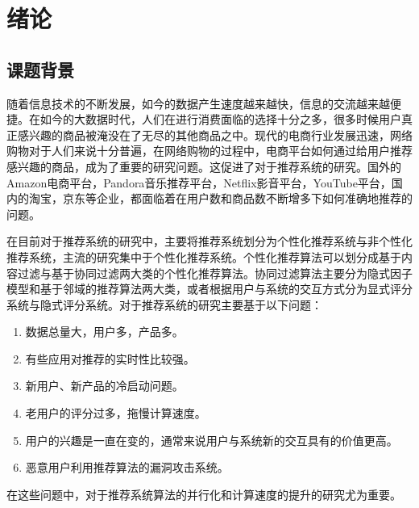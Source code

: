\chapter{绪论}
%
%
%
%
%



\section{课题背景}
随着信息技术的不断发展，如今的数据产生速度越来越快，信息的交流越来越便捷。在如今的大数据时代，人们在进行消费面临的选择十分之多，很多时候用户真正感兴趣的商品被淹没在了无尽的其他商品之中。现代的电商行业发展迅速，网络购物对于人们来说十分普遍，在网络购物的过程中，电商平台如何通过给用户推荐感兴趣的商品，成为了重要的研究问题。这促进了对于推荐系统的研究。国外的Amazon电商平台\cite{Linden:2003kc}，Pandora音乐推荐平台，Netflix影音平台，YouTube平台\cite{Davidson:2010hg}，国内的淘宝，京东等企业，都面临着在用户数和商品数不断增多下如何准确地推荐的问题。

在目前对于推荐系统的研究中，主要将推荐系统划分为个性化推荐系统与非个性化推荐系统，主流的研究集中于个性化推荐系统。个性化推荐算法可以划分成基于内容过滤与基于协同过滤两大类的个性化推荐算法。协同过滤算法主要分为隐式因子模型和基于邻域的推荐算法两大类，或者根据用户与系统的交互方式分为显式评分系统与隐式评分系统。对于推荐系统的研究主要基于以下问题：
\begin{enumerate}
    \item  数据总量大，用户多，产品多。
    \item 有些应用对推荐的实时性比较强。
    \item 新用户、新产品的冷启动问题。
    \item 老用户的评分过多，拖慢计算速度。
    \item  用户的兴趣是一直在变的，通常来说用户与系统新的交互具有的价值更高。
    \item 恶意用户利用推荐算法的漏洞攻击系统。
 \end{enumerate}
 在这些问题中，对于推荐系统算法的并行化和计算速度的提升的研究尤为重要。
 
